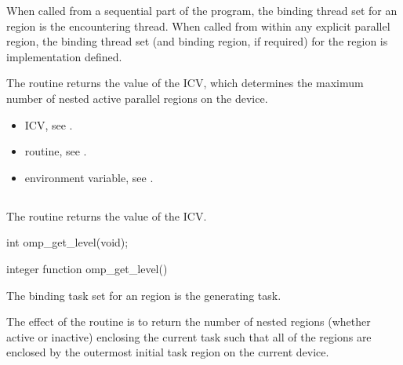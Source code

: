 \binding
When called from a sequential part of the program, the binding thread set for an 
 region is the encountering thread. When called 
from within any explicit parallel region, the binding thread set (and binding region, if 
required) for the  region is implementation defined. 

\effect
The  routine returns the value of the  ICV,
which determines the maximum number of nested active parallel regions 
on the device. 

\crossreferences
\begin{itemize}
\item {} ICV, see 
.

\item {} routine, see 
.

\item {} environment variable, see 
.
\end{itemize}








\subsection{}
\label{subsec:omp_get_level}
\summary
The  routine returns the value of the  ICV. 

\format
\ccppspecificstart
\begin{boxedcode}
int omp\_get\_level(void);
\end{boxedcode}
\ccppspecificend

\fortranspecificstart
\begin{boxedcode}
integer function omp\_get\_level()
\end{boxedcode}
\fortranspecificend

\binding
The binding task set for an  region is the generating task. 

\effect
The effect of the  routine is to return the number of nested 
 regions (whether active or inactive) enclosing the current task such that all 
of the  regions are enclosed by the outermost initial task region on the 
current device.

